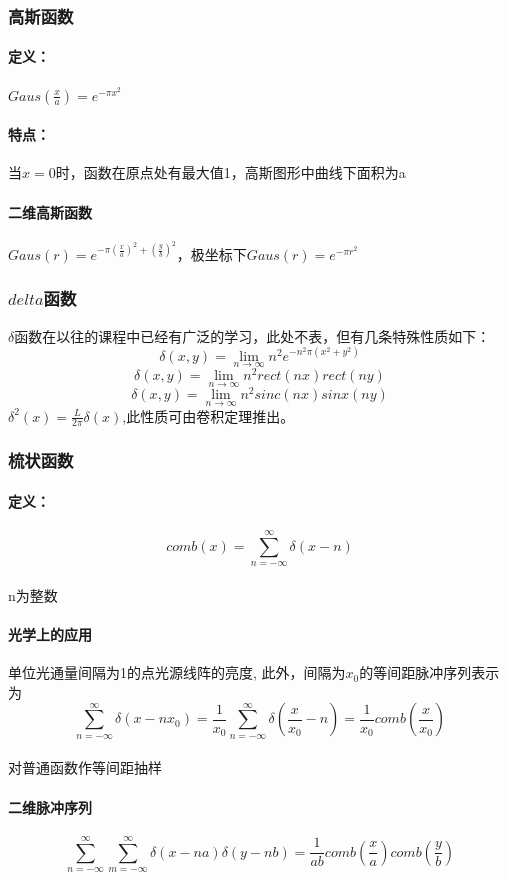 \documentclass[UTF8]{ctexart}
\newcommand{\f}[2]{\frac{#1}{#2}}%
\newcommand{\sumsum}[3]{\sum_{#1=#2}^#3}
\begin{document}
\subsubsection{高斯函数}
\paragraph{定义：}
$Gaus(\f{x}{a})=e^{-\pi x^2}$
\paragraph{特点：}当$x=0$时，函数在原点处有最大值1，高斯图形中曲线下面积为a
\paragraph{二维高斯函数}$
Gaus(r)=e^{-\pi(\f{x}{a})^2+(\f{y}{b})^2}
$，极坐标下$Gaus(r)=e^{-\pi r^2}$
\subsubsection{$delta$函数}
$\delta$函数在以往的课程中已经有广泛的学习，此处不表，但有几条特殊性质如下：
\[\delta(x,y)=\lim\limits_{n\to \infty}n^2e^{-n^2\pi(x^2+y^2)}\]
\[\delta(x,y)=\lim\limits_{n\to \infty}n^2rect(nx)rect(ny)\]
\[\delta(x,y)=\lim\limits_{n\to \infty}n^2sinc(nx)sinx(ny)\]
$\delta^2(x)=\f{L}{2\pi}\delta(x)$,此性质可由卷积定理推出。
\subsubsection{梳状函数}
\paragraph{定义：}\[comb(x)=\sum_{n=-\infty}^\infty \delta{(x-n)}\]\\
n为整数
\paragraph{光学上的应用}单位光通量间隔为1的点光源线阵的亮度,
此外，间隔为$x_{0}$的等间距脉冲序列表示为
\[\sumsum{n}{-\infty}{\infty}\delta{(x-nx_{0})}=\f{1}{x_{0}}\sumsum{n}{-\infty}{\infty}\delta{(\f{x}{x_{0}}-n)}=\f{1}{x_{0}}comb(\f{x}{x_{0}})\]
\\对普通函数作等间距抽样
\paragraph{二维脉冲序列}
\[\sumsum{n}{-\infty}{\infty} \sumsum{m}{-\infty}{\infty}\delta{(x-na)}\delta{(y-nb)}=\f{1}{ab}comb(\f{x}{a})comb(\f{y}{b})\]
\end{document}

